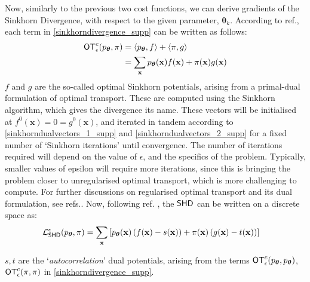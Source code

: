 Now, similarly to the previous two cost functions, we can derive gradients of the Sinkhorn Divergence, with respect to the given parameter, ${\boldsymbol\theta}_k$. According to ref., each term in \eqref{sinkhorndivergence_supp} can be written as follows:
\begin{align}
    \operatorname{\textsf{OT}}^c_\epsilon(p_{\boldsymbol\theta}, \pi) &= \langle p_{\boldsymbol\theta}, f \rangle +  \langle \pi, g \rangle \nonumber \\
    & =\sum\limits_\mathbf{x} p_{\boldsymbol\theta}(\mathbf{x})f(\mathbf{x}) + \pi(\mathbf{x})g(\mathbf{x})
\end{align}
$f$ and $g$ are the so-called optimal Sinkhorn potentials, arising from a primal-dual formulation of optimal transport. These are computed using the Sinkhorn algorithm, which gives the divergence its name. These vectors will be initialised at $f^0(\mathbf{x}) = 0 = g^0(\mathbf{x})$, and iterated in tandem according to \eqref{sinkhorndualvectors_1_supp} and \eqref{sinkhorndualvectors_2_supp} for a fixed number of `Sinkhorn iterations' until convergence. The number of iterations required will depend on the value of $\epsilon$, and the specifics of the problem. Typically, smaller values of epsilon will require more iterations, since this is bringing the problem closer to unregularised optimal transport, which is more challenging to compute. For further discussions on regularised optimal transport and its dual formulation, see refs.. Now, following ref. , the $\operatorname{\textsf{SHD}}$ can be written on a discrete space as:
\begin{align}
    \mathcal{L}_{\operatorname{\textsf{SHD}}}^\epsilon(p_{\boldsymbol\theta}, \pi) = \sum\limits_\mathbf{x}& \left[p_{\boldsymbol\theta}(\mathbf{x})\left(f(\mathbf{x}) - s(\mathbf{x})\right)
    + \pi(\mathbf{x})\left(g(\mathbf{x}) - t(\mathbf{x})\right)\right] \label{sinkhorndualformulation_supp}
\end{align}


\noindent $s, t$ are the `\textit{autocorrelation}' dual potentials, arising from the terms $\operatorname{\textsf{OT}}^c_\epsilon(p_{\boldsymbol\theta}, p_{\boldsymbol\theta})$, $\operatorname{\textsf{OT}}^c_\epsilon(\pi, \pi)$ in \eqref{sinkhorndivergence_supp}.

